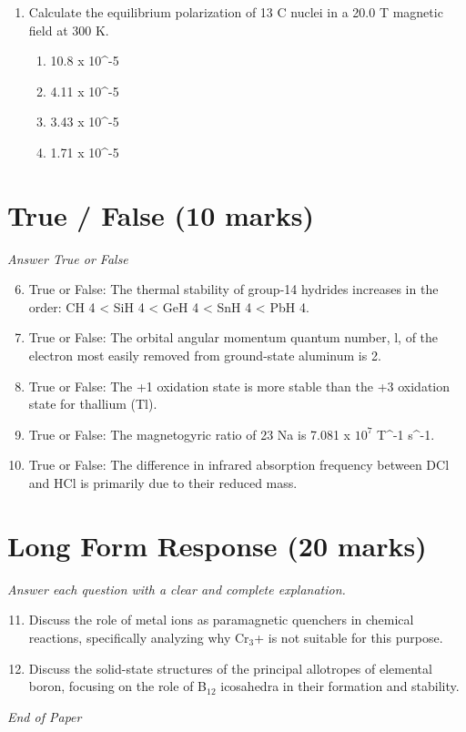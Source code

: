\documentclass[12pt]{article}
\begin{document}
\begin{enumerate}[label=\arabic*.]
\begin{enumerate}[label=(\alph*)]
    \item The process does not involve any work.
    \item The entropy of the system increases.
    \item The total entropy of the system plus surroundings increases.
\end{enumerate}
\item Calculate the equilibrium polarization of 13 C nuclei in a 20.0 T magnetic field at 300 K.
\begin{enumerate}[label=(\alph*)]
    \item 10.8 x 10^-5
    \item 4.11 x 10^-5
    \item 3.43 x 10^-5
    \item 1.71 x 10^-5
\end{enumerate}
\end{enumerate}

\section*{True / False (10 marks)}
\textit{Answer True or False}
\begin{enumerate}[label=\arabic*.]
\setcounter{enumi}{5}
\item True or False: The thermal stability of group-14 hydrides increases in the order: CH 4 \textless{} SiH 4 \textless{} GeH 4 \textless{} SnH 4 \textless{} PbH 4.
\item True or False: The orbital angular momentum quantum number, l, of the electron most easily removed from ground-state aluminum is 2.
\item True or False: The +1 oxidation state is more stable than the +3 oxidation state for thallium (Tl).
\item True or False: The magnetogyric ratio of 23 Na is 7.081 x $10^7$ T^-1 s^-1.
\item True or False: The difference in infrared absorption frequency between DCl and HCl is primarily due to their reduced mass.
\end{enumerate}

\section*{Long Form Response (20 marks)}
\textit{Answer each question with a clear and complete explanation.}
\begin{enumerate}[label=\arabic*.]
\setcounter{enumi}{10}
\item Discuss the role of metal ions as paramagnetic quenchers in chemical reactions, specifically analyzing why Cr$_{3}$+ is not suitable for this purpose.
\item Discuss the solid-state structures of the principal allotropes of elemental boron, focusing on the role of B$_{12}$ icosahedra in their formation and stability.
\end{enumerate}

\vfill
\noindent\textit{End of Paper}
\end{document}
